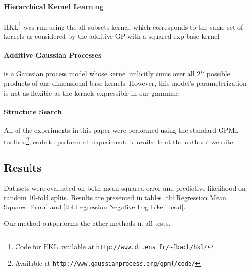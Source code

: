 \documentclass[twoside]{article}
\begin{document}
\paragraph{Hierarchical Kernel Learning}	
HKL\footnote{Code for HKL available at \texttt{http://www.di.ens.fr/\textasciitilde fbach/hkl/}} was run using the all-subsets kernel, which corresponds to the same set of kernels as considered by the additive GP with a squared-exp base kernel.

\paragraph{Additive Gaussian Processes} \cite{duvenaud2011additive11} is a Gaussian process model whose kernel imlicitly sums over all $2^D$ possible products of one-dimensional base kernels.  
However, this model's parameterization is not as flexible as the kernels expressible in our grammar.

\paragraph{Structure Search}
All of the experiments in this paper were performed using the standard GPML toolbox\footnote{Available at \texttt{http://www.gaussianprocess.org/gpml/code/}}; code to perform all experiments is available at the authors' website.


\subsection{Results}

Datasets were evaluated on both mean-squared error and predictive likelihood on random 10-fold splits.
Results are presented in tables \ref{tbl:Regression Mean Squared Error} and \ref{tbl:Regression Negative Log Likelihood}.
%


%
Our method outperforms the other methods in all tests. 
\end{document}
